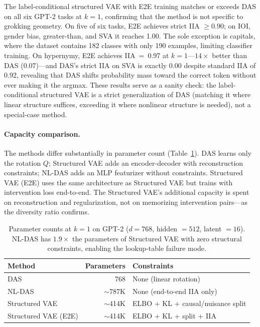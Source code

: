 \documentclass{article}
\begin{document}
The label-conditional structured VAE with E2E training matches or exceeds DAS on all six
GPT-2 tasks at $k{=}1$, confirming that the method is not specific to
grokking geometry. On five of six tasks, E2E achieves strict IIA $\geq 0.90$;
on IOI, gender bias, greater-than, and SVA it reaches 1.00. The sole
exception is capitals, where the dataset contains 182 classes with only 190
examples, limiting classifier training. On hypernymy, E2E achieves
IIA~=~0.97 at $k{=}1$---$14\times$ better than DAS (0.07)---and DAS's strict
IIA on SVA is exactly 0.00 despite standard IIA of 0.92, revealing that DAS
shifts probability mass toward the correct token without ever making it the
argmax. These results serve as a sanity check: the label-conditional structured VAE is a
strict generalization of DAS (matching it where linear structure suffices,
exceeding it where nonlinear structure is needed), not a special-case method.

\paragraph{Capacity comparison.}
The methods differ substantially in parameter count
(Table~\ref{tab:params}). DAS learns only the rotation $Q$; Structured VAE adds
an encoder-decoder with reconstruction constraints; NL-DAS adds an MLP
featurizer without constraints. Structured VAE (E2E) uses the same architecture
as Structured VAE but trains with intervention loss end-to-end. The Structured VAE's
additional capacity is spent on reconstruction and regularization, not
on memorizing intervention pairs---as the diversity ratio confirms.

\begin{table}[t]
\centering
\small
\begin{tabular}{lrl}
\toprule
Method & Parameters & Constraints \\
\midrule
DAS         & 768     & None (linear rotation) \\
NL-DAS      & $\sim$787K  & None (end-to-end IIA only) \\
Structured VAE      & $\sim$414K  & ELBO + KL + causal/nuisance split \\
Structured VAE (E2E)  & $\sim$414K  & ELBO + KL + split + IIA \\
\bottomrule
\end{tabular}
\caption{Parameter counts at $k{=}1$ on GPT-2 ($d = 768$, hidden $= 512$,
  latent $= 16$). NL-DAS has $1.9\times$ the parameters of Structured VAE with
  zero structural constraints, enabling the lookup-table failure mode.}
\label{tab:params}
\end{table}
\end{document}
